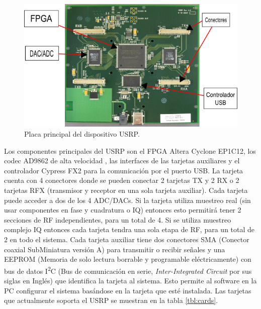 \begin{figure}[t]
\centering
	\includegraphics[width=5.5in]{figs/usrp}
	\vspace{0.3in}
	\caption{Placa principal del dispositivo USRP.}
	\label{fig:sisusrp}
\end{figure}

Los componentes principales del USRP son el FPGA Altera Cyclone EP1C12, los codec AD9862 de alta
velocidad , las interfaces de las tarjetas auxiliares y el controlador Cypress FX2 para la
comunicaci\'on por el puerto USB. La tarjeta cuenta con 4 conectores donde se pueden conectar 2
tarjetas TX y 2 RX o 2 tarjetas RFX (transmisor y receptor en una sola tarjeta auxiliar). Cada
tarjeta puede acceder a dos de los 4 ADC/DACs. Si la tarjeta utiliza muestreo real (sin usar componentes en fase y cuadratura o
IQ) entonces esto permitir\'a tener 2 secciones de RF independientes, para un total de 4. Si se utiliza
muestreo complejo IQ entonces cada tarjeta tendra una sola etapa de RF, para un total de 2 en todo
el sistema. Cada tarjeta auxiliar tiene dos conectores SMA (Conector coaxial SubMiniatura versi\'on A) para transmitir o recibir
se\~nales y una EEPROM (Memoria de solo lectura borrable y programable el\'ectricamente) con bus de datos I\textsuperscript{2}C
(Bus de comunicaci\'on en serie, \emph{Inter-Integrated Circuit} por sus siglas en Ingl\'es) que identifica la tarjeta al sistema.
Esto permite al software en la PC configurar el sistema bas\'andose en la tarjeta que est\'e instalada. Las tarjetas que
actualmente soporta el USRP se muestran en la tabla \ref{tbl:cards}.

